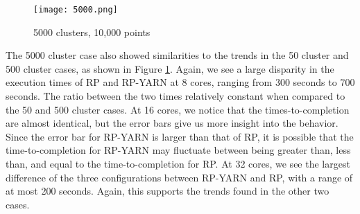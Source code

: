 \documentclass[]{article}
\begin{document}
		\begin{figure}[H]
			\centering
			\texttt{[image: 5000.png]}
			\caption{5000 clusters, 10,000 points}
			\label{fig:5000}
		\end{figure}

		The 5000 cluster case also showed similarities to the trends in the 50 cluster and 500 cluster cases, as shown in Figure \ref{fig:5000}. Again, we see a large disparity in the execution times of RP and RP-YARN at 8 cores, ranging from 300 seconds to 700 seconds. The ratio between the two times relatively constant when compared to the 50 and 500 cluster cases. At 16 cores, we notice that the times-to-completion are almost identical, but the error bars give us more insight into the behavior. Since the error bar for RP-YARN is larger than that of RP, it is possible that the time-to-completion for RP-YARN may fluctuate between being greater than, less than, and equal to the time-to-completion for RP. At 32 cores, we see the largest difference of the three configurations between RP-YARN and RP, with a range of at most 200 seconds. Again, this supports the trends found in the other two cases. 


		

\end{document}
